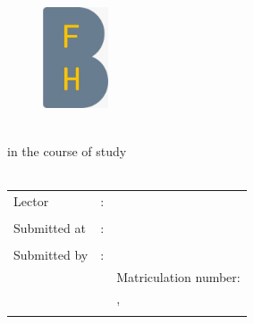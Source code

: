 \begin{titlepage}
\pagestyle{empty}

\begin{flushleft}
\begin{figure}[ht]
\flushleft
\includegraphics[height=3cm]{content/pictures/bfh_logo.jpeg}
\end{figure}
\end{flushleft}

\begin{center}
{\fontsize{18}{22} \selectfont \docKindOfWork}\\[5mm]
{\fontsize{18}{22} \selectfont in the course of study} \\[5mm]
{\fontsize{18}{22} \selectfont \docFieldOfStudy}\\
\vspace{1cm}

\begin{onehalfspace}
{\fontsize{18}{22} \selectfont \docSecondTitle}


\end{onehalfspace}
\end{center}

\vfill
\begin{center}
\begin{tabular}{lcl}
Lector  		&:& \docFirstLector 	\\ \\
Submitted at	&:& \docHandOverDate 	\\ \\
Submitted by 	&:& \docPrename~\docSurname\\
				& & Matriculation number: \docStudentnumber\\
				& & \docStreet,~\docZip~\docLocation\\
				& & \docEmail
					
\end{tabular}
\end{center}
\end{titlepage}